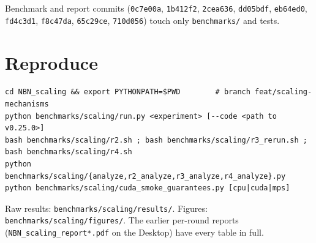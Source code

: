 \documentclass[10pt,a4paper]{article}
\newcommand{\code}[1]{\texttt{#1}}
\begin{document}
Benchmark and report commits (\code{0c7e00a}, \code{1b412f2}, \code{2cea636}, \code{dd05bdf},
\code{eb64ed0}, \code{fd4c3d1}, \code{f8c47da}, \code{65c29ce}, \code{710d056}) touch only
\code{benchmarks/} and tests.

\section{Reproduce}
\begin{verbatim}
cd NBN_scaling && export PYTHONPATH=$PWD        # branch feat/scaling-mechanisms
python benchmarks/scaling/run.py <experiment> [--code <path to v0.25.0>]
bash benchmarks/scaling/r2.sh ; bash benchmarks/scaling/r3_rerun.sh ; bash benchmarks/scaling/r4.sh
python benchmarks/scaling/{analyze,r2_analyze,r3_analyze,r4_analyze}.py
python benchmarks/scaling/cuda_smoke_guarantees.py [cpu|cuda|mps]
\end{verbatim}
Raw results: \code{benchmarks/scaling/results/}. Figures: \code{benchmarks/scaling/figures/}.
The earlier per-round reports (\code{NBN\_scaling\_report*.pdf} on the Desktop) have every
table in full.
\end{document}
